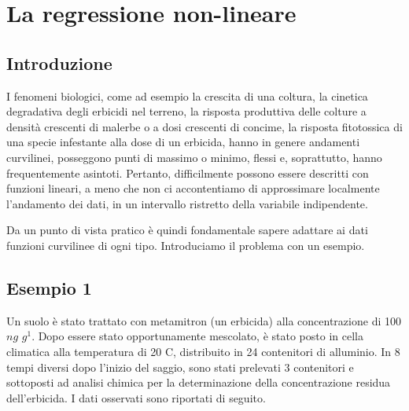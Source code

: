 \documentclass[a4paper,12pt,oneside]{book}
\newenvironment{Shaded}{\begin{snugshade}}{\end{snugshade}}
\newcommand{\KeywordTok}[1]{\textcolor[rgb]{0.13,0.29,0.53}{\textbf{#1}}}
\newcommand{\DataTypeTok}[1]{\textcolor[rgb]{0.13,0.29,0.53}{#1}}
\newcommand{\StringTok}[1]{\textcolor[rgb]{0.31,0.60,0.02}{#1}}
\newcommand{\OperatorTok}[1]{\textcolor[rgb]{0.81,0.36,0.00}{\textbf{#1}}}
\newcommand{\NormalTok}[1]{#1}
\theoremstyle{definition}
\theoremstyle{definition}
\theoremstyle{definition}
\theoremstyle{remark}
\begin{document}
\begin{Shaded}
\end{Shaded}

\chapter{La regressione non-lineare}\label{la-regressione-non-lineare}

\section{Introduzione}\label{introduzione-6}

I fenomeni biologici, come ad esempio la crescita di una coltura, la
cinetica degradativa degli erbicidi nel terreno, la risposta produttiva
delle colture a densità crescenti di malerbe o a dosi crescenti di
concime, la risposta fitotossica di una specie infestante alla dose di
un erbicida, hanno in genere andamenti curvilinei, posseggono punti di
massimo o minimo, flessi e, soprattutto, hanno frequentemente asintoti.
Pertanto, difficilmente possono essere descritti con funzioni lineari, a
meno che non ci accontentiamo di approssimare localmente l'andamento dei
dati, in un intervallo ristretto della variabile indipendente.

Da un punto di vista pratico è quindi fondamentale sapere adattare ai
dati funzioni curvilinee di ogni tipo. Introduciamo il problema con un
esempio.

\section{Esempio 1}\label{esempio-1-1}

Un suolo è stato trattato con metamitron (un erbicida) alla
concentrazione di 100 \(ng \,\, g^1\). Dopo essere stato opportunamente
mescolato, è stato posto in cella climatica alla temperatura di 20
\textdegree C, distribuito in 24 contenitori di alluminio. In 8 tempi
diversi dopo l'inizio del saggio, sono stati prelevati 3 contenitori e
sottoposti ad analisi chimica per la determinazione della concentrazione
residua dell'erbicida. I dati osservati sono riportati di seguito.
\end{document}
